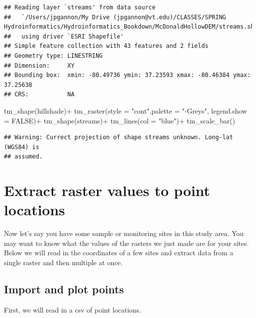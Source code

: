 \documentclass[
]{book}
\newenvironment{Shaded}{\begin{snugshade}}{\end{snugshade}}
\newcommand{\AttributeTok}[1]{\textcolor[rgb]{0.77,0.63,0.00}{#1}}
\newcommand{\ConstantTok}[1]{\textcolor[rgb]{0.00,0.00,0.00}{#1}}
\newcommand{\FunctionTok}[1]{\textcolor[rgb]{0.00,0.00,0.00}{#1}}
\newcommand{\NormalTok}[1]{#1}
\newcommand{\SpecialCharTok}[1]{\textcolor[rgb]{0.00,0.00,0.00}{#1}}
\newcommand{\StringTok}[1]{\textcolor[rgb]{0.31,0.60,0.02}{#1}}
\begin{document}
\begin{verbatim}
## Reading layer `streams' from data source 
##   `/Users/jpgannon/My Drive (jpgannon@vt.edu)/CLASSES/SPRING Hydroinformatics/Hydroinformatics_Bookdown/McDonaldHollowDEM/streams.shp' 
##   using driver `ESRI Shapefile'
## Simple feature collection with 43 features and 2 fields
## Geometry type: LINESTRING
## Dimension:     XY
## Bounding box:  xmin: -80.49736 ymin: 37.23593 xmax: -80.46384 ymax: 37.25638
## CRS:           NA
\end{verbatim}

\begin{Shaded}
\begin{Highlighting}[]
\FunctionTok{tm\_shape}\NormalTok{(hillshade)}\SpecialCharTok{+}
  \FunctionTok{tm\_raster}\NormalTok{(}\AttributeTok{style =} \StringTok{"cont"}\NormalTok{,}\AttributeTok{palette =} \StringTok{"{-}Greys"}\NormalTok{, }\AttributeTok{legend.show =} \ConstantTok{FALSE}\NormalTok{)}\SpecialCharTok{+}
\FunctionTok{tm\_shape}\NormalTok{(streams)}\SpecialCharTok{+}
  \FunctionTok{tm\_lines}\NormalTok{(}\AttributeTok{col =} \StringTok{"blue"}\NormalTok{)}\SpecialCharTok{+}
  \FunctionTok{tm\_scale\_bar}\NormalTok{()}
\end{Highlighting}
\end{Shaded}

\begin{verbatim}
## Warning: Currect projection of shape streams unknown. Long-lat (WGS84) is
## assumed.
\end{verbatim}

\hypertarget{extract-raster-values-to-point-locations}{%
\section{Extract raster values to point locations}\label{extract-raster-values-to-point-locations}}

Now let's say you have some sample or monitoring sites in this study area. You may want to know what the values of the rasters we just made are for your sites. Below we will read in the coordinates of a few sites and extract data from a single raster and then multiple at once.

\hypertarget{import-and-plot-points}{%
\subsection{Import and plot points}\label{import-and-plot-points}}

First, we will read in a csv of point locations.
\end{document}
